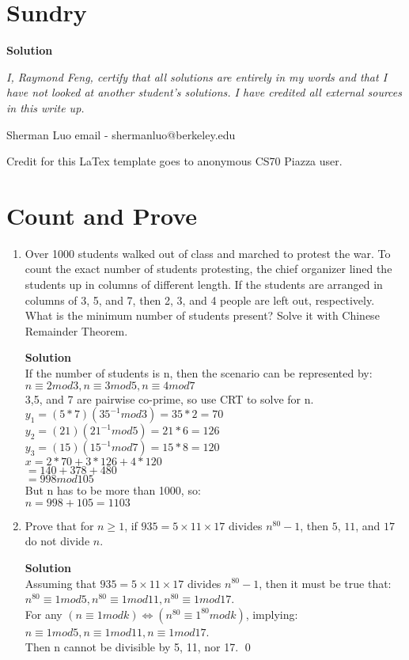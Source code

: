 \documentclass[11pt]{article}
\newcommand*{\Question}[1]{\section{#1}}
\newenvironment{Parts}{\begin{enumerate}[label=(\alph*)]}{\end{enumerate}}
\newcommand*{\Part}{\item}
\begin{document}
\Question{Sundry} 
\vspace{10pt}
\begin{mdframed} \textbf{Solution} 
\item \textit {I, Raymond Feng, certify that all solutions are entirely in my words and that I have not looked at another student's solutions. I have credited all external sources in this write up.}
\item Sherman Luo email - shermanluo@berkeley.edu
\item Credit for this LaTex template goes to anonymous CS70 Piazza user.
\end{mdframed}

\Question{Count and Prove}
\begin{Parts}
\Part
Over 1000 students walked out of class and marched to protest the war. To count the exact number of students protesting, the chief organizer lined the students up in columns of different length. If the students are arranged in columns of 3, 5, and 7, then 2, 3, and 4 people are left out, respectively.  What is the minimum number of students present?  Solve it with Chinese Remainder Theorem. 
\begin{mdframed} \textbf{Solution} \\
If the number of students is n, then the scenario can be represented by: \\
$n \equiv 2mod3, n \equiv 3mod5, n \equiv 4mod7$ \\
3,5, and 7 are pairwise co-prime, so use CRT to solve for n. \\
$y_1=(5*7)(35^{-1}mod3)=35*2=70$ \\
$y_2=(21)(21^{-1}mod5)=21*6=126$ \\
$y_3=(15)(15^{-1}mod7)=15*8=120$ \\
$x=2*70+3*126+4*120$ \\
$=140+378+480$ \\
$=998mod105$ \\
But n has to be more than 1000, so: \\
$n=998+105=1103$
\end{mdframed}

\Part
Prove that for $n\geq 1$, if $935 = 5 \times 11 \times 17$ divides $n^{80} -1$, then $5$, $11$, and $17$ do not divide $n$.
\begin{mdframed} \textbf{Solution} \\
Assuming that $935 = 5 \times 11 \times 17$ divides $n^{80} -1$, then it must be true that: \\
$n^{80} \equiv 1mod5, n^{80} \equiv 1mod11, n^{80} \equiv 1mod17$. \\
For any $(n \equiv 1modk) \Leftrightarrow (n^{80} \equiv 1^{80}modk)$, implying: \\
$n \equiv 1mod5, n \equiv 1mod11, n \equiv 1mod17$. \\
Then n cannot be divisible by 5, 11, nor 17. \qed
\end{mdframed}
\end{Parts}
\end{document}
